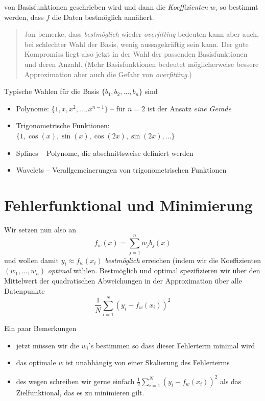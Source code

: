 \documentclass[]{book}
\providecommand{\tightlist}{%
  \setlength{\itemsep}{0pt}\setlength{\parskip}{0pt}}
\theoremstyle{definition}
\theoremstyle{definition}
\theoremstyle{definition}
\theoremstyle{definition}
\theoremstyle{remark}
\begin{document}
von Basisfunktionen geschrieben wird und dann die \emph{Koeffizienten} \(w_i\) so bestimmt werden, dass \(f\) die Daten bestmöglich annähert.

\begin{quote}
Jan bemerke, dass \emph{bestmöglich} wieder \emph{overfitting} bedeuten kann aber auch, bei schlechter Wahl der Basis, wenig aussagekräftig sein kann. Der gute Kompromiss liegt also jetzt in der Wahl der passenden Basisfunktionen und deren Anzahl. (Mehr Basisfunktionen bedeutet möglicherweise bessere Approximation aber auch die Gefahr von \emph{overfitting}.)
\end{quote}

Typische Wahlen für die Basis \(\{b_1, b_2, \dotsc, b_n\}\) sind

\begin{itemize}
\tightlist
\item
  Polynome: \(\{1, x, x^2, \dotsc, x^{n-1}\}\) -- für \(n=2\) ist der Ansatz \emph{eine Gerade}
\item
  Trigonometrische Funktionen: \(\{1, \cos(x), \sin(x), \cos(2x), \sin(2x), \dotsc\}\)
\item
  Splines -- Polynome, die abschnittsweise definiert werden
\item
  Wavelets -- Verallgemeinerungen von trigonometrischen Funktionen
\end{itemize}

\hypertarget{sec-linreg-minimierung}{%
\section{Fehlerfunktional und Minimierung}\label{sec-linreg-minimierung}}

Wir setzen nun also an
\begin{equation*}
f_w(x) = \sum_{j=1}^nw_j b_j (x)
\end{equation*}
und wollen damit \(y_i \approx f_w(x_i)\) \emph{bestmöglich} erreichen (indem wir die Koeffizienten \((w_1, \dotsc, w_n)\) \emph{optimal} wählen. Bestmöglich und optimal spezifizieren wir über den Mittelwert der quadratischen Abweichungen in der Approximation über alle Datenpunkte
\begin{equation*}
\frac{1}{N}\sum_{i=1}^N (y_i - f_w(x_i))^2
\end{equation*}

Ein paar Bemerkungen

\begin{itemize}
\tightlist
\item
  jetzt müssen wir die \(w_i\)'s bestimmen so dass dieser Fehlerterm minimal wird
\item
  das optimale \(w\) ist unabhängig von einer Skalierung des Fehlerterms
\item
  des wegen schreiben wir gerne einfach \(\frac 12 \sum_{i=1}^N (y_i - f_w(x_i))^2\) als das Zielfunktional, das es zu minimieren gilt.
\end{itemize}
\end{document}
